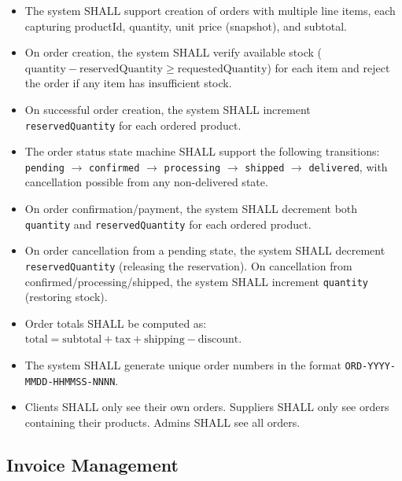 \documentclass[12pt,a4paper]{report}
\begin{document}
\begin{tcolorbox}[reqbox,title={FR-ORD: Order Requirements}]
\begin{itemize}[leftmargin=1.5em]
  \item {} The system SHALL support creation of orders with multiple line items, each capturing productId, quantity, unit price (snapshot), and subtotal.
  \item {} On order creation, the system SHALL verify available stock ($\text{quantity} - \text{reservedQuantity} \geq \text{requestedQuantity}$) for each item and reject the order if any item has insufficient stock.
  \item {} On successful order creation, the system SHALL increment \texttt{reservedQuantity} for each ordered product.
  \item {} The order status state machine SHALL support the following transitions: \texttt{pending} $\to$ \texttt{confirmed} $\to$ \texttt{processing} $\to$ \texttt{shipped} $\to$ \texttt{delivered}, with cancellation possible from any non-delivered state.
  \item {} On order confirmation/payment, the system SHALL decrement both \texttt{quantity} and \texttt{reservedQuantity} for each ordered product.
  \item {} On order cancellation from a pending state, the system SHALL decrement \texttt{reservedQuantity} (releasing the reservation). On cancellation from confirmed/processing/shipped, the system SHALL increment \texttt{quantity} (restoring stock).
  \item {} Order totals SHALL be computed as: $\text{total} = \text{subtotal} + \text{tax} + \text{shipping} - \text{discount}$.
  \item {} The system SHALL generate unique order numbers in the format \texttt{ORD-YYYY-MMDD-HHMMSS-NNNN}.
  \item {} Clients SHALL only see their own orders. Suppliers SHALL only see orders containing their products. Admins SHALL see all orders.
\end{itemize}
\end{tcolorbox}

\subsection{Invoice Management}
\end{document}
